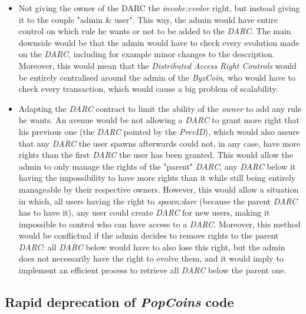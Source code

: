 \begin{itemize}
    \item Not giving the owner of the DARC the \textit{invoke:evolve} right, but instead giving it to the couple "admin \& user". This way, the admin would have entire control on which rule he wants or not to be added to the \textit{DARC}. The main downside would be that the admin would have to check every evolution made on the \textit{DARC}, including for example minor changes to the description. Moreover, this would mean that the \textit{Distributed Access Right Controls} would be entirely centralised around the admin of the \textit{ByzCoin}, who would have to check every transaction, which would cause a big problem of scalability.
    
    \item Adapting the \textit{DARC} contract to limit the ability of the \textit{owner} to add any rule he wants. An avenue would be not allowing a \textit{DARC} to grant more right that his previous one (the \textit{DARC} pointed by the \textit{PrevID}), which would also assure that any \textit{DARC} the user spawns afterwards could not, in any case, have more rights than the first \textit{DARC} the user has been granted. This would allow the admin to only manage the rights of the "parent" \textit{DARC}, any \textit{DARC} below it having the impossibility to have more rights than it while still being entirely manageable by their respective owners. However, this would allow a situation in which, all users having the right to \textit{spawn:darc} (because the parent \textit{DARC} has to have it), any user could create \textit{DARC} for new users, making it impossible to control who can have access to a \textit{DARC}. Moreover, this method would be conflictual if the admin decides to remove rights to the parent \textit{DARC}: all \textit{DARC} below would have to also lose this right, but the admin does not necessarily have the right to evolve them, and it would imply to implement an efficient process to retrieve all \textit{DARC} below the parent one.
\end{itemize}

\subsection{Rapid deprecation of \textit{PopCoins} code}
\label{subsection62}

\paragraph{}

